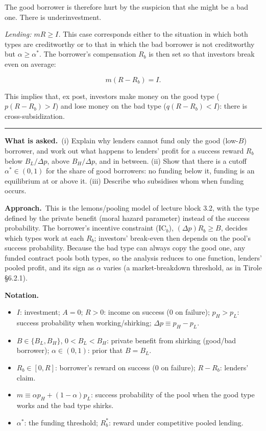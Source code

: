 \documentclass[11pt,a4paper]{article}
\newcommand{\notation}{\par\noindent\textbf{Notation.}}
\newcommand{\asked}{\par\medskip\noindent\textbf{What is asked.}~}
\newcommand{\approach}{\par\smallskip\noindent\textbf{Approach.}~}
\newcommand{\stmtend}{\par\endgroup\nopagebreak\noindent\rule{\linewidth}{0.4pt}\par\medskip}
\begin{document}
The good borrower is therefore hurt by the suspicion that she might be a bad one. There is
underinvestment.

\emph{Lending: \(mR \geqslant I\).} This case corresponds either to the situation in which both
types are creditworthy or to that in which the bad borrower is not creditworthy but
\(\alpha \geqslant \alpha^*\). The borrower's compensation \(R_b\) is then set so that investors
break even on average:

\[m(R - R_b) = I.\]

This implies that, ex post, investors make money on the good type (\(p(R - R_b) > I\)) and lose
money on the bad type (\(q(R - R_b) < I\)): there is cross-subsidization.
\stmtend

\asked (i) Explain why lenders cannot fund only the good (low-$B$) borrower, and work out what happens to lenders' profit for a success reward $R_b$ below $B_L/\Delta p$, above $B_H/\Delta p$, and in between. (ii) Show that there is a cutoff $\alpha^*\in(0,1)$ for the share of good borrowers: no funding below it, funding is an equilibrium at or above it. (iii) Describe who subsidises whom when funding occurs.

\approach This is the lemons/pooling model of lecture block 3.2, with the type defined by the private benefit (moral hazard parameter) instead of the success probability. The borrower's incentive constraint (IC$_b$), $(\Delta p)R_b\ge B$, decides which types work at each $R_b$; investors' break-even then depends on the pool's success probability. Because the bad type can always copy the good one, any funded contract pools both types, so the analysis reduces to one function, lenders' pooled profit, and its sign as $\alpha$ varies (a market-breakdown threshold, as in Tirole \S6.2.1).

\notation
\begin{itemize}
  \item $I$: investment; $A=0$; $R>0$: income on success (0 on failure); $p_H>p_L$: success probability when working/shirking; $\Delta p\equiv p_H-p_L$.
  \item $B\in\{B_L,B_H\}$, $0<B_L<B_H$: private benefit from shirking (good/bad borrower); $\alpha\in(0,1)$: prior that $B=B_L$.
  \item $R_b\in[0,R]$: borrower's reward on success (0 on failure); $R-R_b$: lenders' claim.
  \item $m\equiv\alpha p_H+(1-\alpha)p_L$: success probability of the pool when the good type works and the bad type shirks.
  \item $\alpha^*$: the funding threshold; $R_b^*$: reward under competitive pooled lending.
\end{itemize}
\end{document}
